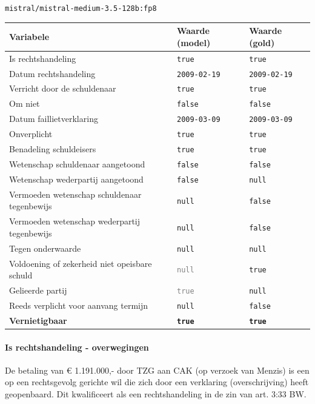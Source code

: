 \documentclass[
  dutch,
  a4paper,
]{article}
\begin{document}
\texttt{mistral/mistral-medium-3.5-128b:fp8}

\begin{center}
\small
\begin{tabular}{@{}p{7.4cm}p{2.6cm}p{2.6cm}@{}}
\toprule
Variabele & Waarde (model) & Waarde (gold) \\
\midrule
Is rechtshandeling & \texttt{true} & \texttt{true} \\
Datum rechtshandeling & \texttt{2009-02-19} & \texttt{2009-02-19} \\
Verricht door de schuldenaar & \texttt{true} & \texttt{true} \\
Om niet & \texttt{false} & \texttt{false} \\
Datum faillietverklaring & \texttt{2009-03-09} & \texttt{2009-03-09} \\
Onverplicht & \texttt{true} & \texttt{true} \\
Benadeling schuldeisers & \texttt{true} & \texttt{true} \\
Wetenschap schuldenaar aangetoond & \texttt{false} & \texttt{false} \\
Wetenschap wederpartij aangetoond & \texttt{false} & \texttt{null} \\
Vermoeden wetenschap schuldenaar tegenbewijs & \texttt{null} & \texttt{false} \\
Vermoeden wetenschap wederpartij tegenbewijs & \texttt{null} & \texttt{false} \\
Tegen onderwaarde & \texttt{null} & \texttt{null} \\
Voldoening of zekerheid niet opeisbare schuld & \textcolor{gray}{\texttt{null}} & \texttt{true} \\
Gelieerde partij & \textcolor{gray}{\texttt{true}} & \texttt{null} \\
Reeds verplicht voor aanvang termijn & \texttt{null} & \texttt{false} \\
\textbf{Vernietigbaar} & \textbf{\texttt{true}} & \textbf{\texttt{true}} \\
\bottomrule
\end{tabular}
\end{center}

\paragraph{Is rechtshandeling - overwegingen}\label{is-rechtshandeling---overwegingen-84}

De betaling van € 1.191.000,- door TZG aan CAK (op verzoek van Menzis) is een op een rechtsgevolg gerichte wil die zich door een verklaring (overschrijving) heeft geopenbaard. Dit kwalificeert als een rechtshandeling in de zin van art. 3:33 BW.
\end{document}
